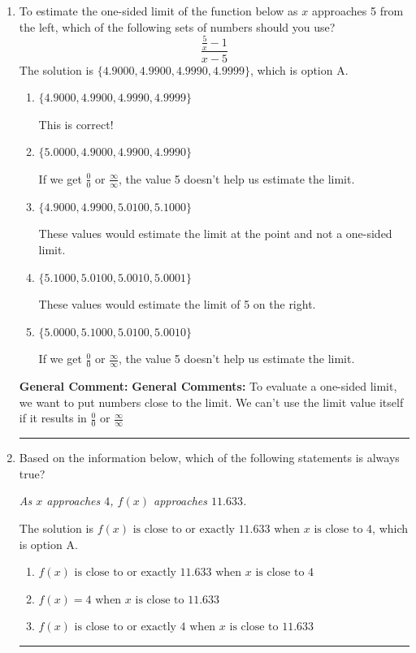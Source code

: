 \documentclass{extbook}[14pt]
\newcommand{\litem}[1]{\item #1

\rule{\textwidth}{0.4pt}}
\begin{document}
\begin{enumerate}\litem{
To estimate the one-sided limit of the function below as $x$ approaches 5 from the left, which of the following sets of numbers should you use?
\[ \frac{\frac{5}{x} - 1}{x - 5} \]The solution is \( \{ 4.9000, 4.9900, 4.9990, 4.9999 \} \), which is option A.\begin{enumerate}[label=\Alph*.]
\item \( \{ 4.9000, 4.9900, 4.9990, 4.9999 \} \)

This is correct!
\item \( \{ 5.0000, 4.9000, 4.9900, 4.9990 \} \)

If we get $\frac{0}{0}$ or $\frac{\infty}{\infty}$, the value 5 doesn't help us estimate the limit.
\item \( \{ 4.9000, 4.9900, 5.0100, 5.1000 \} \)

These values would estimate the limit at the point and not a one-sided limit.
\item \( \{ 5.1000, 5.0100, 5.0010, 5.0001 \} \)

These values would estimate the limit of 5 on the right.
\item \( \{ 5.0000, 5.1000, 5.0100, 5.0010 \} \)

If we get $\frac{0}{0}$ or $\frac{\infty}{\infty}$, the value 5 doesn't help us estimate the limit.
\end{enumerate}

\textbf{General Comment:} \textbf{General Comments:} To evaluate a one-sided limit, we want to put numbers close to the limit. We can't use the limit value itself if it results in $\frac{0}{0}$ or $\frac{\infty}{\infty}$
}
\litem{
Based on the information below, which of the following statements is always true?

\begin{center}
    \textit{ As $x$ approaches $4$, $f(x)$ approaches $11.633$. }
\end{center}
The solution is \( f(x) \text{ is close to or exactly } 11.633 \text{ when } x \text{ is close to } 4 \), which is option A.\begin{enumerate}[label=\Alph*.]
\item \( f(x) \text{ is close to or exactly } 11.633 \text{ when } x \text{ is close to } 4 \)


\item \( f(x) = 4 \text{ when } x \text{ is close to } 11.633 \)


\item \( f(x) \text{ is close to or exactly } 4 \text{ when } x \text{ is close to } 11.633 \)



\end{enumerate}}
\end{enumerate}
\end{document}

